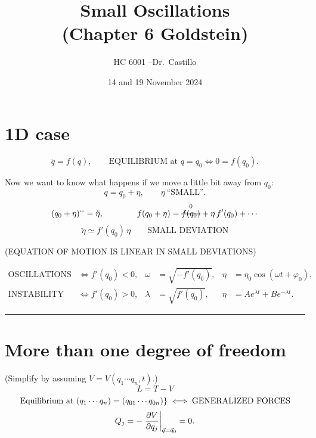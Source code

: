 \documentclass[11pt]{article}
\title{\textbf{Small Oscillations}\\[2pt] \large (Chapter 6 Goldstein)}
\author{HC 6001 \quad--\quad Dr.\ Castillo}
\date{14 and 19 November 2024}
\newcommand{\rmath}[1]{\text{\retracted{\ensuremath{#1}}}}
\begin{document}
\maketitle

\section*{1D case}

\begin{equation*}
  \ddot q = f(q),
  \qquad
  \text{EQUILIBRIUM at } q = q_0
  \iff
  0 = f(q_0).
\end{equation*}

Now we want to know what happens if we move a little bit away from $q_0$:
\begin{equation*}
  q = q_0 + \eta,
  \qquad \eta \ \text{``SMALL''}.
\end{equation*}
\begin{equation*}
  (q_0+\eta)^{\bm{\cdot\cdot}} = \ddot\eta,
  \qquad\qquad
  f(q_0+\eta) = \overset{0}{\rmath{f(q_0)}} + \eta\, f'(q_0) + \cdots
\end{equation*}
\begin{equation*}
  \ddot\eta \simeq f'(q_0)\,\eta
  \qquad \text{SMALL DEVIATION}
\end{equation*}
\begin{center}
  (EQUATION OF MOTION IS \textcolor{notesred}{LINEAR} IN SMALL DEVIATIONS)
\end{center}

\begin{align*}
  \text{OSCILLATIONS} &\iff f'(q_0) < 0,
    & \omega &= \sqrt{-f'(q_0)},
    & \eta &= \eta_0 \cos(\omega t + \varphi_0),\\
  \text{INSTABILITY}  &\iff f'(q_0) > 0,
    & \lambda &= \sqrt{f'(q_0)},
    & \eta &= A e^{\lambda t} + B e^{-\lambda t}.
\end{align*}

\hrule\vspace{6pt}

\section*{More than one degree of freedom}

(Simplify by assuming $V = V(q_1 \cdots q_n, t)$.)
\begin{equation*}
  L = T - V
\end{equation*}
\begin{gather*}
  \left.\text{Equilibrium at } (q_1 \cdots q_n) = (q_{01}\cdots q_{0n}) \right\}
  \iff
  \text{GENERALIZED FORCES}\\[2pt]
  Q_j = -\left.\frac{\partial V}{\partial q_j}\right|_{\vec q = \vec q_0} = 0 .
\end{gather*}
\end{document}
